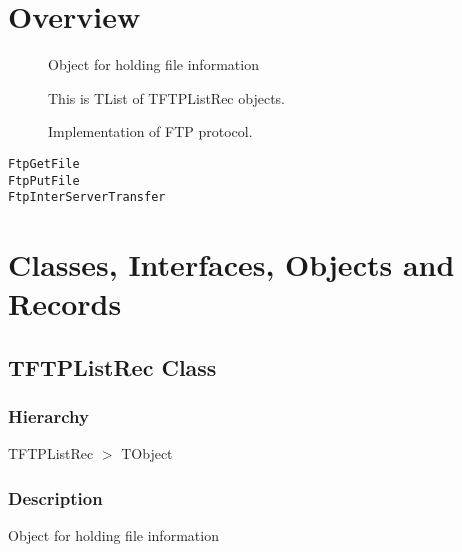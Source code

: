 \documentclass{report}
\newif\ifpdf
\begin{document}
\section{Overview}
\begin{description}
\item[\texttt{\begin{ttfamily}TFTPListRec\end{ttfamily} Class}]Object for holding file information
\item[\texttt{\begin{ttfamily}TFTPList\end{ttfamily} Class}]This is TList of TFTPListRec objects.
\item[\texttt{\begin{ttfamily}TFTPSend\end{ttfamily} Class}]Implementation of FTP protocol.
\end{description}
\begin{description}
\item[\texttt{FtpGetFile}]
\item[\texttt{FtpPutFile}]
\item[\texttt{FtpInterServerTransfer}]
\end{description}
\section{Classes, Interfaces, Objects and Records}
\ifpdf
\subsection*{\large{\textbf{TFTPListRec Class}}\normalsize\hspace{1ex}\hrulefill}
\else
\subsection*{TFTPListRec Class}
\fi
\label{ftpsend.TFTPListRec}
\subsubsection*{\large{\textbf{Hierarchy}}\normalsize\hspace{1ex}\hfill}
TFTPListRec {$>$} TObject
\subsubsection*{\large{\textbf{Description}}\normalsize\hspace{1ex}\hfill}
Object for holding file information\hfill\vspace*{1ex}
\end{document}
